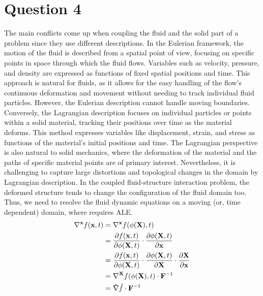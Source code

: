 \documentclass[a4paper,12pt]{article} %
\begin{document}
\section{\textbf{Question 4}}
The main conflicts come up when coupling the fluid and the solid part of a problem since they use different descriptions.
In the Eulerian framework, the motion of the fluid is described from a spatial point of view, focusing on specific points 
in space through which the fluid flows. Variables such as velocity, pressure, and density are expressed as functions of 
fixed spatial positions and time. This approach is natural for fluids, as it allows for the easy handling of the flow's 
continuous deformation and movement without needing to track individual fluid particles. However, the
Eulerian description cannot handle moving boundaries. 
Conversely, the Lagrangian description focuses on individual particles or points within a solid material, tracking their 
positions over time as the material deforms. This method expresses variables like displacement, strain, and stress as 
functions of the material's initial positions and time. The Lagrangian perspective is also natural to solid mechanics, 
where the deformation of the material and the paths of specific material points are of primary interest.
Nevertheless, it is challenging to capture large distortions and topological changes in the domain by Lagrangian description.
In the coupled fluid-structure interaction problem, the deformed structure tends to change
the configuration of the fluid domain too. Thus, we need to resolve the fluid dynamic
equations on a moving (or, time dependent) domain, where requires ALE.
\begin{align*}
\nabla^{\mathbf{x}} f(\mathbf{x},t) &= \nabla^{\mathbf{x}} f(\phi (\mathbf{X}),t)\\
&= \frac{\partial f(\mathbf{x},t)}{\partial \phi(\mathbf{X},t)} \cdot \frac{\partial \phi(\mathbf{X},t)}{\partial \mathbf{x}}\\
&= \frac{\partial f(\mathbf{x},t)}{\partial \phi(\mathbf{X},t)} \cdot \frac{\partial \phi(\mathbf{X},t)}{\partial \mathbf{X}} \cdot \frac{\partial \mathbf{X}}{\partial \mathbf{x}}\\
&= \nabla^{\mathbf{X}} f(\phi (\mathbf{X}),t) \cdot {\mathbf{F}}^{-1}\\
&= \hat \nabla \hat f \cdot {\mathbf{F}}^{-1}
\end{align*}


\newpage
\end{document}
